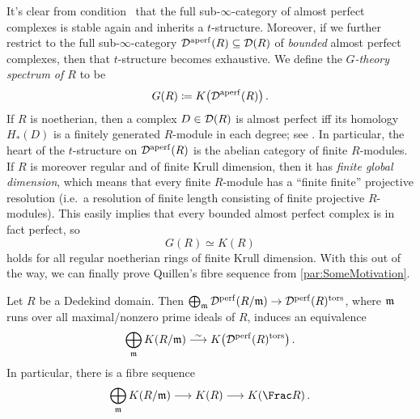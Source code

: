 \documentclass[a4paper, 10pt, oneside, DIV=9, chapterprefix=true, numbers=enddot,bibliography=totoc]{scrbook}
\begin{document}
It's clear from condition~ that the full sub-$\infty$-category of almost perfect complexes is stable again and inherits a $t$-structure. Moreover, if we further restrict to the full sub-$\infty$-category $\mathcal{D}^\mathrm{aperf}(R)\subseteq \mathcal{D}(R)$ of \emph{bounded} almost perfect complexes, then that $t$-structure becomes exhaustive. We define the \emph{$G$-theory spectrum of $R$} to be
\begin{equation*}
	G(R)\coloneqq K\big(\mathcal{D}^{\mathrm{aperf}}(R)\big)\,.
\end{equation*}
If $R$ is noetherian, then a complex $D\in \mathcal{D}(R)$ is almost perfect iff its homology $H_*(D)$ is a finitely generated $R$-module in each degree; see \cite[]{stacks-project}. In particular, the heart of the $t$-structure on $\mathcal{D}^\mathrm{aperf}(R)$ is the abelian category of finite $R$-modules. If $R$ is moreover regular and of finite Krull dimension, then it has \emph{finite global dimension}, which means that every finite $R$-module has a \enquote{finite finite} projective resolution (i.e.\ a resolution of finite length consisting of finite projective $R$-modules). This easily implies that every bounded almost perfect complex is in fact perfect, so
\begin{equation*}
	G(R)\simeq K(R)
\end{equation*}
holds for all regular noetherian rings of finite Krull dimension. With this out of the way, we can finally prove Quillen's fibre sequence from \cref{par:SomeMotivation}.
\begin{cor}\label{cor:QuillensFibreSequenceII}
	Let $R$ be a Dedekind domain. Then $\bigoplus_\mm\Dd^\perf(R/\mm)\morphism \Dd^\perf(R)^\mathrm{tors}$, where $\mathfrak{m}$ runs over all maximal/nonzero prime ideals of $R$, induces an equivalence
	\begin{equation*}
		\bigoplus_\mm K(R/\mm)\isomorphism K\big(\Dd^\perf(R)^\mathrm{tors}\big)\,.
	\end{equation*}
	In particular, there is a fibre sequence
	\begin{equation*}
		\bigoplus_\mm K(R/\mm)\morphism K(R)\morphism K(\Frac R)\,.
	\end{equation*}
\end{cor}
\end{document}
